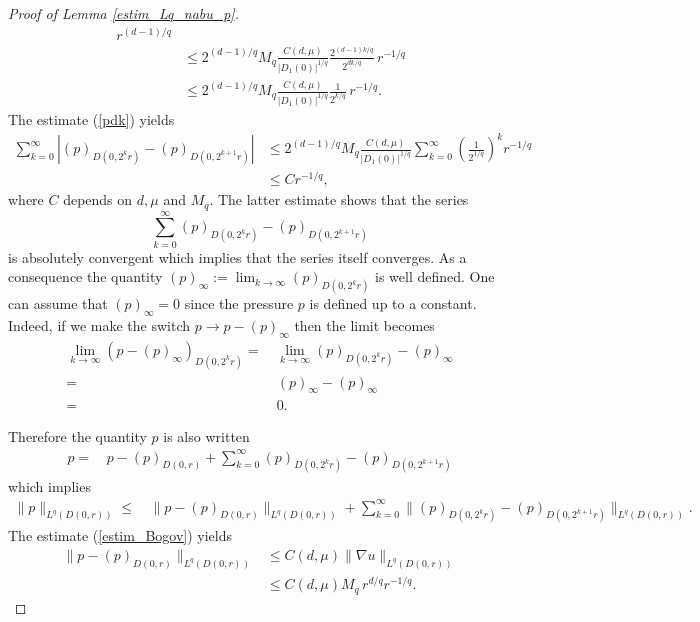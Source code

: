 \documentclass[11pt, reqno]{amsart}
\theoremstyle{definition}
\theoremstyle{remark}
\numberwithin{equation}{section}
\begin{document}
\begin{appendices}
\begin{proof}[Proof of \textup{Lemma \ref{estim_Lq_nabu_p}}]
\begin{align}
		\, r^{(d-1)/q} \nonumber \\ 
		&\leq 2^{(d-1)/q}M_q\frac{C(d,\mu)}{|D_1(0)|^{1/q}} \frac{  2^{(d-1)k/q} }{2^{dk/q}}
		\,r^{-1/q} \nonumber\\
		&\leq 2^{(d-1)/q}M_q\frac{C(d,\mu)}{|D_1(0)|^{1/q}} \frac{1}{2^{k/q}} 
		\,r^{-1/q}.\label{pdk}
	\end{align}
	The estimate (\ref{pdk}) yields
	\begin{align*}
		\sum^\infty_{k=0}\left|  (p)_{D(0,2^k r)} -  (p)_{D(0,2^{k+1} r)}  \right| &\leq 2^{(d-1)/q}M_q\frac{C(d,\mu)}{|D_1(0)|^{1/q}} \sum^\infty_{k=0}\left(\frac{1}{2^{1/q}} \right)^k  r^{-1/q}\\
		&\leq C r^{-1/q},
	\end{align*}	
	where $C$ depends on $d,\mu$ and $M_q$. The latter estimate shows that the series  $$\sum^\infty_{k=0}    (p)_{D(0,2^k r)} -  (p)_{D(0,2^{k+1} r)}  $$ is absolutely convergent which implies that the series itself converges. As a consequence the quantity $(p)_\infty :=\lim_{k\rightarrow \infty}(p)_{D(0,2^k r)}$ is well defined.  One can assume that $(p)_\infty =0$ since the pressure $p$ is defined up to a constant. Indeed, if we make the switch $p\rightarrow p- (p)_\infty$ then the limit becomes
	\begin{align*}
		\lim_{k\rightarrow \infty} \left( p-(p)_\infty \right)_{D(0,2^k r)}
		=&\,  \lim_{k\rightarrow \infty} (p)_{D(0,2^{k} r)} - (p)_\infty \\
		=& \: (p)_\infty - (p)_\infty \\
		=& \: 0.
	\end{align*}	
	
	\noindent  Therefore the quantity $p$ is also written 
	\begin{align}
		p
		=&\, p -(p)_{D(0,r)}   +\sum^\infty_{k=0}   (p)_{D(0,2^k r)} -  (p)_{D(0,2^{k+1} r)} \label{def_q}
	\end{align}	
	which implies
	\begin{align}
		\|p\|_{L^q(D(0,r))} 
		\leq&\, \|p -(p)_{D(0,r)} \|_{L^q(D(0,r))}  +\sum^\infty_{k=0}   \|(p)_{D(0,2^k r)} -  (p)_{D(0,2^{k+1} r)} \|_{L^q(D(0,r))}. \label{triangul_ineq}
	\end{align}	
	The estimate (\ref{estim_Bogov}) yields 
	\begin{align*}
		\|p-(p)_{D(0,r)} \|_{L^q(D(0,r))}& \leq C(d,\mu) \|\nabla u\|_{L^q(D(0,r))} \\
		& \leq C(d,\mu) M_q \,r^{d/q}r^{-1/q}.
	\end{align*}	
	

\end{proof}
\end{appendices}
\end{document}

